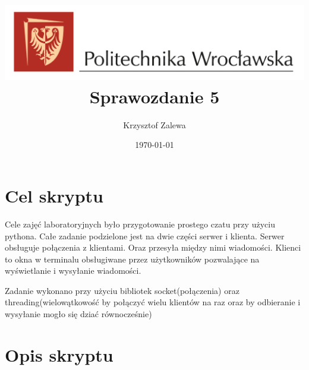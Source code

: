 \documentclass{article}
\title{
  \centering
  \includegraphics[width=\textwidth]{images/logo_PWr_kolor_poziom.png}\\
  \fontsize{28pt}{30pt}\selectfont Sprawozdanie 5\\
  }
\author{Krzysztof Zalewa}
\date{\daymonthyear\today}
\begin{document}
    \maketitle
    \pagebreak
    \tableofcontents
    \FloatBarrier
    \raggedright
    \section{Cel skryptu}
        Cele zajęć laboratoryjnych było przygotowanie prostego czatu przy użyciu pythona.
        Całe zadanie podzielone jest na dwie części serwer i klienta. Serwer obsługuje połączenia z klientami.
        Oraz przesyła między nimi wiadomości.
        Klienci to okna w terminalu obsługiwane przez użytkowników pozwalające na wyświetlanie i wysyłanie wiadomości.

        Zadanie wykonano przy użyciu bibliotek socket(połączenia) oraz threading(wielowątkowość by połączyć wielu klientów na raz
        oraz by odbieranie i wysyłanie mogło się dziać równocześnie)

    \section{Opis skryptu}
      
      
\end{document}
